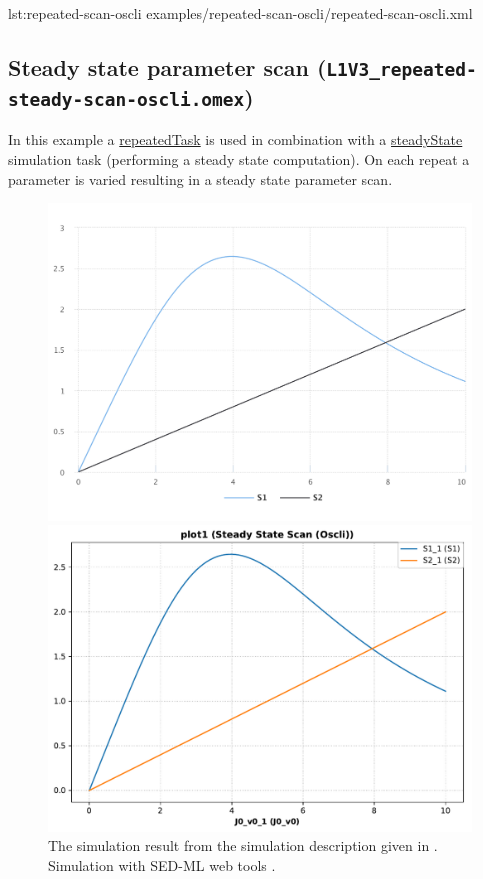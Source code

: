 {lst:repeated-scan-oscli}
{examples/repeated-scan-oscli/repeated-scan-oscli.xml}

\subsection{Steady state parameter scan (\texttt{L1V3\_repeated-steady-scan-oscli.omex})}
In this example a \hyperref[class:repeatedTask]{repeatedTask} is used in combination with a \hyperref[class:steadyState]{steadyState} simulation task (performing a steady state computation). On each repeat a parameter is varied resulting in a steady state parameter scan.

\begin{figure}[ht!]
    \centering
    \begin{minipage}{0.47\textwidth}
        \centering
        \includegraphics[width=1.0\textwidth]{examples/repeated-steady-scan-oscli/results/sedml_webtools/plot1}
        \caption{The simulation result from the simulation description given in . Simulation with SED-ML web tools \citep{bergmann2017sed}.}
    \end{minipage}\hfill
    \begin{minipage}{0.47\textwidth}
        \centering
        \includegraphics[width=1.0\textwidth]{examples/repeated-steady-scan-oscli/results/tellurium/plot1}

\end{minipage}
\end{figure}
